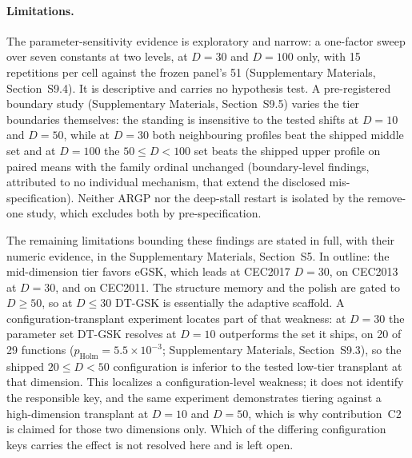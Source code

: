 \documentclass[10pt,a4paper]{article}
\newcommand{\dtgsk}{DT-GSK}
\newcommand{\egsk}{eGSK}
\begin{document}
\paragraph{Limitations.}
The parameter-sensitivity evidence is exploratory and narrow: a one-factor
sweep over seven constants at two levels, at $D = 30$ and $D = 100$ only, with
15 repetitions per cell against the frozen panel's 51 (Supplementary Materials,
Section~S9.4). It is descriptive and carries no hypothesis test. A
pre-registered boundary study (Supplementary Materials,
Section~S9.5) varies the tier boundaries themselves: the standing is
insensitive to the tested shifts at $D = 10$ and $D = 50$, while at $D = 30$
both neighbouring profiles beat the shipped middle set and at $D = 100$ the
$50 \leq D < 100$ set beats the shipped upper profile on paired means with
the family ordinal unchanged (boundary-level findings, attributed to no
individual mechanism, that extend the disclosed mis-specification).
Neither ARGP nor the deep-stall restart is isolated by the remove-one study,
which excludes both by pre-specification.

The remaining limitations bounding these findings are stated in full, with
their numeric evidence, in the Supplementary Materials, Section~S5. In
outline: the
mid-dimension tier favors \egsk{}, which leads at CEC2017 $D = 30$, on CEC2013
at $D = 30$, and on CEC2011. The structure memory and the polish are gated to
$D \geq 50$, so at $D \leq 30$ \dtgsk{} is essentially the adaptive scaffold.
A configuration-transplant experiment locates part of that
weakness: at $D = 30$ the parameter set \dtgsk{} resolves at $D = 10$
outperforms the set it ships, on 20 of 29 functions
($p_{\mathrm{Holm}} = 5.5\times10^{-3}$; Supplementary Materials,
Section~S9.3), so the shipped $20 \leq D < 50$ configuration is inferior to
the tested low-tier transplant at that dimension. This localizes a
configuration-level weakness; it does not identify the responsible key, and
the same experiment demonstrates tiering against a high-dimension transplant
at $D = 10$ and $D = 50$, which is why contribution~C2 is claimed for those
two dimensions only. Which of the differing configuration keys carries
the effect is not resolved here and is left open.
\end{document}

